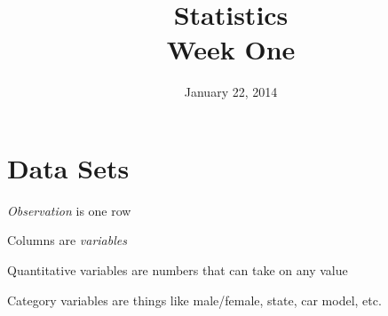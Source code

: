 \documentclass{exam}
\author{}
\date{January 22, 2014}
\title{Statistics \\ Week One}
\begin{document}
  \maketitle

  \section{Data Sets}
  \begin{itemize*}
    \item {\em Observation} is one row
    \item Columns are {\em variables}
    \item Quantitative variables are numbers that can take on any value
    \item Category variables are things like male/female, state, car model, etc.
  \end{itemize*}
\end{document}
